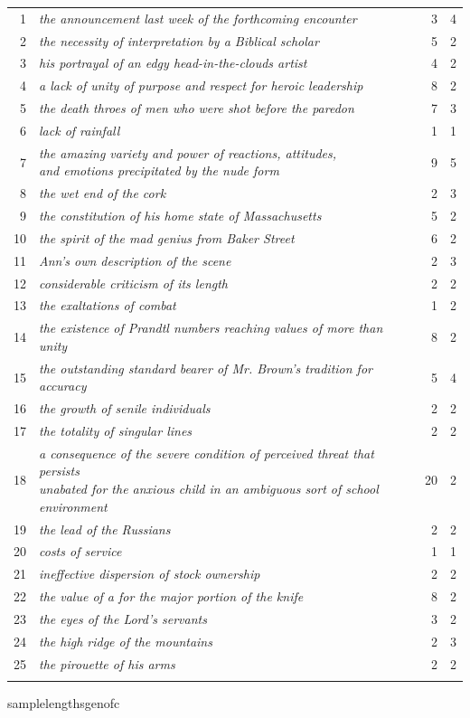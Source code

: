 \begin{table}[!htbp]
{\begin{tabular}[t]{rlrr}
\midrule
 1  & \textit{the announcement last week of the forthcoming encounter} & 3 & 4 \\
 2  & \textit{the necessity of interpretation by a Biblical scholar} & 5 & 2 \\
 3  & \textit{his portrayal of an edgy head-in-the-clouds artist} & 4 & 2 \\
 4  & \textit{a lack of unity of purpose and respect for heroic leadership} & 8 & 2 \\
 5  & \textit{the death throes of men who were shot before the paredon} & 7 & 3 \\
 6  & \textit{lack of rainfall} & 1 & 1 \\
 7  & \makecell[lt]{\textit{the amazing variety and power of reactions, attitudes,} \\ \textit{and emotions precipitated by the nude form}} & 9 & 5 \\
 8  & \textit{the wet end of the cork} & 2 & 3 \\
 9  & \textit{the constitution of his home state of Massachusetts} & 5 & 2 \\
10  & \textit{the spirit of the mad genius from Baker Street} & 6 & 2 \\
11  & \textit{Ann's own description of the scene} & 2 & 3 \\
12  & \textit{considerable criticism of its length} & 2 & 2 \\
13  & \textit{the exaltations of combat} & 1 & 2 \\
14  & \textit{the existence of Prandtl numbers reaching values of more than unity} & 8 & 2 \\
15  & \textit{the outstanding standard bearer of Mr.  Brown's tradition for accuracy} & 5 & 4 \\
16  & \textit{the growth of senile individuals} & 2 & 2 \\
17  & \textit{the totality of singular lines} & 2 & 2 \\
18  & \makecell[lt]{\textit{a consequence of the severe condition of perceived threat that persists } \\ \textit{unabated for the anxious child in an ambiguous sort of school environment}} & 20 & 2 \\
19  & \textit{the lead of the Russians} & 2 & 2 \\
20  & \textit{costs of service} & 1 & 1 \\
21  & \textit{ineffective dispersion of stock ownership} & 2 & 2 \\
22  & \textit{the value of a for the major portion of the knife} & 8 & 2 \\
23  & \textit{the eyes of the Lord's servants} & 3 & 2 \\
24  & \textit{the high ridge of the mountains} & 2 & 3 \\
25  & \textit{the pirouette of his arms} & 2 & 2 \\
\lspbottomrule
\end{tabular}}
\end{table}
samplelengthsgenofc

